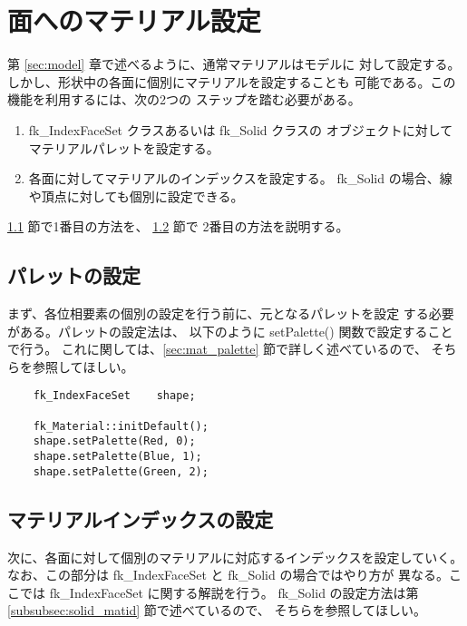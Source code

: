 \section{面へのマテリアル設定} \label{subsec:ifs_mat}
第 \ref{sec:model} 章で述べるように、通常マテリアルはモデルに
対して設定する。しかし、形状中の各面に個別にマテリアルを設定することも
可能である。この機能を利用するには、次の2つの
ステップを踏む必要がある。
\begin{enumerate}
 \item fk\_IndexFaceSet クラスあるいは fk\_Solid クラスの
	オブジェクトに対してマテリアルパレットを設定する。
 \item 各面に対してマテリアルのインデックスを設定する。
	fk\_Solid の場合、線や頂点に対しても個別に設定できる。
\end{enumerate}
\ref{subsubsec:ifs_palette} 節で1番目の方法を、
\ref{subsubsec:ifs_matid} 節で
2番目の方法を説明する。
\subsection{パレットの設定} \label{subsubsec:ifs_palette}
まず、各位相要素の個別の設定を行う前に、元となるパレットを設定
する必要がある。パレットの設定法は、
以下のように setPalette() 関数で設定することで行う。
これに関しては、\ref{sec:mat_palette} 節で詳しく述べているので、
そちらを参照してほしい。
\\
\begin{breakbox}
\begin{verbatim}
    fk_IndexFaceSet    shape;

    fk_Material::initDefault();
    shape.setPalette(Red, 0);
    shape.setPalette(Blue, 1);
    shape.setPalette(Green, 2);
\end{verbatim}
\end{breakbox}
\subsection{マテリアルインデックスの設定} \label{subsubsec:ifs_matid}
次に、各面に対して個別のマテリアルに対応するインデックスを設定していく。
なお、この部分は fk\_IndexFaceSet と fk\_Solid の場合ではやり方が
異なる。ここでは fk\_IndexFaceSet に関する解説を行う。
fk\_Solid の設定方法は第 \ref{subsubsec:solid_matid} 節で述べているので、
そちらを参照してほしい。

